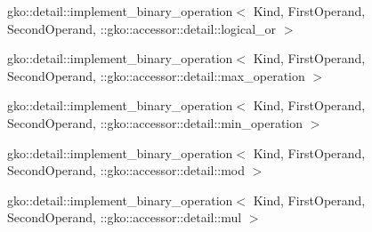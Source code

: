 \begin{DoxyCompactList}
\begin{DoxyCompactList}
\end{DoxyCompactList}
\item gko\+:\+:detail\+:\+:implement\+\_\+binary\+\_\+operation$<$ Kind, First\+Operand, Second\+Operand, \+:\+:gko\+:\+:accessor\+:\+:detail\+:\+:logical\+\_\+or $>$\begin{DoxyCompactList}
\item {}
\end{DoxyCompactList}
\item gko\+:\+:detail\+:\+:implement\+\_\+binary\+\_\+operation$<$ Kind, First\+Operand, Second\+Operand, \+:\+:gko\+:\+:accessor\+:\+:detail\+:\+:max\+\_\+operation $>$\begin{DoxyCompactList}
\item {}
\end{DoxyCompactList}
\item gko\+:\+:detail\+:\+:implement\+\_\+binary\+\_\+operation$<$ Kind, First\+Operand, Second\+Operand, \+:\+:gko\+:\+:accessor\+:\+:detail\+:\+:min\+\_\+operation $>$\begin{DoxyCompactList}
\item {}
\end{DoxyCompactList}
\item gko\+:\+:detail\+:\+:implement\+\_\+binary\+\_\+operation$<$ Kind, First\+Operand, Second\+Operand, \+:\+:gko\+:\+:accessor\+:\+:detail\+:\+:mod $>$\begin{DoxyCompactList}
\item {}
\end{DoxyCompactList}
\item gko\+:\+:detail\+:\+:implement\+\_\+binary\+\_\+operation$<$ Kind, First\+Operand, Second\+Operand, \+:\+:gko\+:\+:accessor\+:\+:detail\+:\+:mul $>$\begin{DoxyCompactList}
\item {}

\end{DoxyCompactList}
\end{DoxyCompactList}
